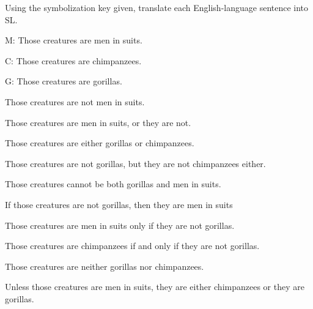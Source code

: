 \problempart Using the symbolization key given, translate each English-language sentence into SL.
\label{pr.monkeysuits}
\begin{ekey}
\item[M:] Those creatures are men in suits. 
\item[C:] Those creatures are chimpanzees. 
\item[G:] Those creatures are gorillas.
\end{ekey}
\begin{earg}
\item Those creatures are not men in suits. %
\item Those creatures are men in suits, or they are not. %
\item Those creatures are either gorillas or chimpanzees. %
\item Those creatures are not gorillas, but they are not chimpanzees either. %
\item Those creatures cannot be both gorillas and men in suits. %
\item If those creatures are not gorillas, then they are men in suits %
\item Those creatures are men in suits only if they are not gorillas. %
\item Those creatures are chimpanzees if and only if they are not gorillas. %
\item Those creatures are neither gorillas nor chimpanzees. %
\item Unless those creatures are men in suits, they are either chimpanzees or they are gorillas. %
\end{earg}


